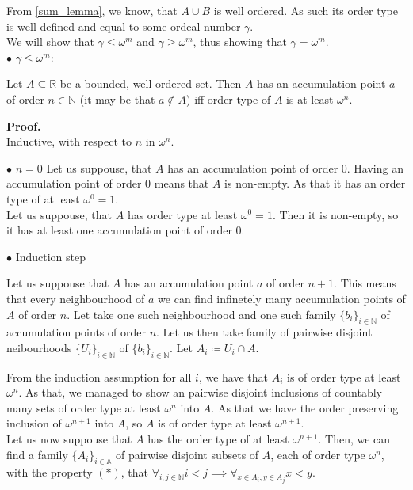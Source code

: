 From \ref{sum_lemma}, we know, that $A\cup B$ is well ordered. As such its order type is well 
defined and equal to some ordeal number $\gamma$. \\

We will show that $\gamma \leq \omega^m$ and $\gamma \geq \omega^m$, 
thus showing that $\gamma = \omega^m$. \\

$\bullet$ $\gamma \leq \omega^m$: \\

\begin{lemma}\label{accumulation_points_and_order}
Let $A \subseteq \mathbb{R}$ be a bounded, well ordered set. 
Then $A$ has an accumulation point $a$ of order 
$n \in \mathbb{N}$ (it may be that $a \notin A$) iff order type of $A$ is at least $\omega^n$. 
\end{lemma}

\textbf{Proof.}\\
Inductive, with respect to $n$ in $\omega^n$.

$\bullet$ $n=0$
Let us suppouse, that $A$ has an accumulation point of order $0$.
Having an accumulation point of order $0$ means that $A$ is non-empty. As that it has an order 
type of at least $\omega^0 = 1$. \\

Let us suppouse, that $A$ has order type at least $\omega^0=1$. Then it is non-empty, so it 
has at least one accumulation point of order $0$. 

$\bullet$ Induction step

Let us suppouse that $A$ has an accumulation point $a$ of order $n+1$. This means that every 
neighbourhood of $a$ we can find infinetely many accumulation points of $A$ of order $n$. 
Let take one such neighbourhood and one such family $\{b_i\}_{i \in \mathbb{N}}$ 
of accumulation points of order $n$. 
Let us then take family of pairwise disjoint neibourhoods $\{U_i\}_{i\in\mathbb{N}}$ of 
$\{b_i\}_{i \in \mathbb{N}}$. Let $A_i \coloneqq U_i\cap A$. 

From the induction assumption for all $i$, we have that $A_i$ is of order type at least 
$\omega^n$. As that, we managed to show an pairwise disjoint inclusions of countably many sets 
of order type at least $\omega^n$ into $A$. As that we have the order preserving inclusion of 
$\omega^{n+1}$ into $A$, so $A$ is of order type at least $\omega^{n+1}$. \\

Let us now suppouse that $A$ has the order type of at least $\omega^{n+1}$. Then, we can find 
a family $\{A_i\}_{i \in \mathbb{A}}$ 
of pairwise disjoint subsets of $A$, each of order type $\omega^{n}$, with the property $(\ast)$, 
that $\forall_{i,j\in\mathbb{N}}i<j \implies \forall_{x \in A_i,y\in A_j} x< y$. 

